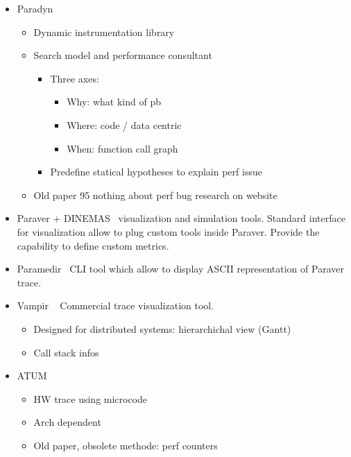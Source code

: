 \begin{itemize}
    \item Paradyn~\cite{Miller95Paradyn}
        \begin{itemize}
            \item Dynamic instrumentation library
            \item Search model and performance consultant
                \begin{itemize}
                    \item Three axes:
                        \begin{itemize}
                            \item Why: what kind of pb
                            \item Where: code / data centric
                            \item When: function call graph
                        \end{itemize}
                    \item Predefine statical hypotheses to explain perf issue
                \end{itemize}
            \item Old paper 95 nothing about perf bug research on website
        \end{itemize}
    \item Paraver + DINEMAS~\cite{Pillet95PARAVER} visualization and
        simulation tools. Standard interface for visualization allow to plug
        custom tools inside Paraver. Provide the capability to define custom
        metrics.
    \item Paramedir~\cite{Jost04Paramedir} CLI tool which allow to display
        ASCII representation of Paraver trace.
    \item Vampir ~\cite{Brunst01Performance} %
        Commercial trace visualization tool.
        \begin{itemize}
            \item Designed for distributed systems: hierarchichal view (Gantt)
            \item Call stack infos
        \end{itemize}
    \item ATUM~\cite{Agarwal86ATUM}
        \begin{itemize}
            \item HW trace using microcode
            \item Arch dependent
            \item Old paper, obsolete methode: perf counters

\end{itemize}
\end{itemize}
